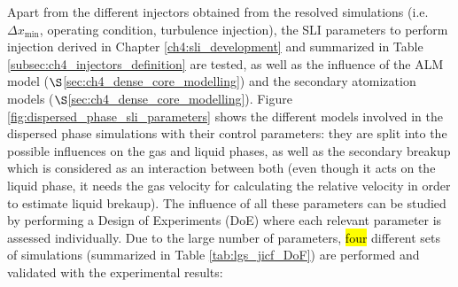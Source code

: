 Apart from the different injectors obtained from the resolved simulations (i.e. $\Delta x_\mathrm{min}$, operating condition, turbulence injection), the SLI parameters to perform injection derived in Chapter \ref{ch4:sli_development} and summarized in Table \ref{subsec:ch4_injectors_definition} are tested, as well as the influence of the ALM model ($\S$\ref{sec:ch4_dense_core_modelling}) and the secondary atomization models ($\S$\ref{sec:ch4_dense_core_modelling}). Figure \ref{fig:dispersed_phase_sli_parameters} shows the different models involved in the dispersed phase simulations with their control parameters: they are split into the possible influences on the gas and liquid phases, as well as the secondary breakup which is considered as an interaction between both (even though it acts on the liquid phase, it needs the gas velocity for calculating the relative velocity in order to estimate liquid brekaup). The influence of all these parameters can be studied by performing a Design of Experiments (DoE) where each relevant parameter is assessed individually. Due to the large number of parameters, \hl{four} different sets of simulations (summarized in Table \ref{tab:lgs_jicf_DoF}) are performed and validated with the experimental results:

